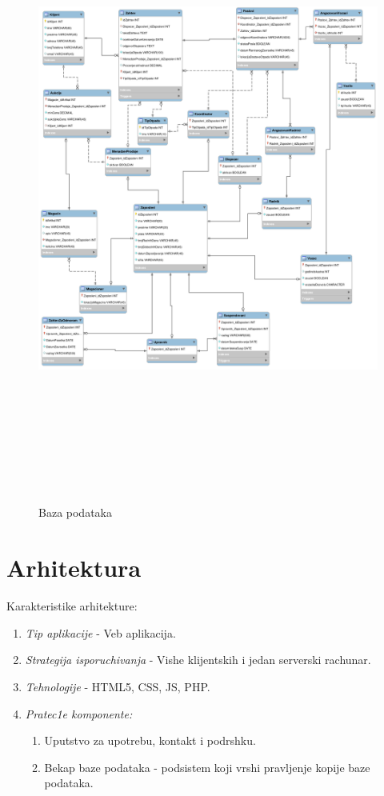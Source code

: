 \documentclass[10 pt]{article}
\begin{document}
		\begin{figure}[H]
			\centering
			\includegraphics[width=15cm,height=20cm,keepaspectratio]{slike/baza.png}\\
			\caption{Baza podataka}
			\label{fig:BazaPodataka}
		\end{figure}

	\newpage
	\section{Arhitektura}
		
		Karakteristike arhitekture:
		\begin{enumerate}
			\item\textit{Tip aplikacije} - Veb aplikacija.
			\item\textit{Strategija isporuchivanja} - Vishe klijent{s}kih i jedan serverski rachunar.
			\item\textit{Tehnologije} - HTML5, CSS, JS, PHP.
			\item\textit{Pratec1e komponente:}
				\begin{enumerate}
					\item Uputstvo za upotrebu, kontakt i podrshku.
					\item Bekap baze podataka - podsistem koji vrshi pravljenje kopije baze podataka.
				\end{enumerate}
		\end{enumerate}
		
\end{document}
